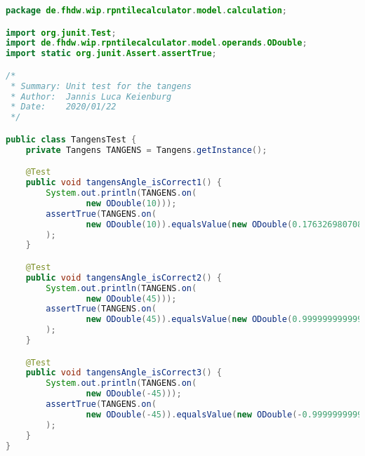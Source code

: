 \begin{lstlisting}[caption=TangensTest (Keienburg),label=list:TangensTest,language=Java]
package de.fhdw.wip.rpntilecalculator.model.calculation;

import org.junit.Test;
import de.fhdw.wip.rpntilecalculator.model.operands.ODouble;
import static org.junit.Assert.assertTrue;

/*
 * Summary: Unit test for the tangens
 * Author:  Jannis Luca Keienburg
 * Date:    2020/01/22
 */

public class TangensTest {
    private Tangens TANGENS = Tangens.getInstance();

    @Test
    public void tangensAngle_isCorrect1() {
        System.out.println(TANGENS.on(
                new ODouble(10)));
        assertTrue(TANGENS.on(
                new ODouble(10)).equalsValue(new ODouble(0.17632698070846498))
        );
    }

    @Test
    public void tangensAngle_isCorrect2() {
        System.out.println(TANGENS.on(
                new ODouble(45)));
        assertTrue(TANGENS.on(
                new ODouble(45)).equalsValue(new ODouble(0.9999999999999999))
        );
    }

    @Test
    public void tangensAngle_isCorrect3() {
        System.out.println(TANGENS.on(
                new ODouble(-45)));
        assertTrue(TANGENS.on(
                new ODouble(-45)).equalsValue(new ODouble(-0.9999999999999999))
        );
    }
}
\end{lstlisting} 

